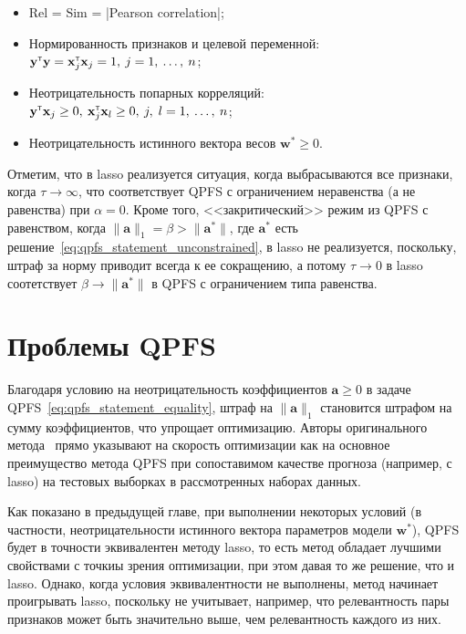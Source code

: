 \documentclass[12pt, a4paper]{article}
\newcommand{\T}{{\text{\tiny\sffamily\upshape\mdseries T}}}
\newcommand{\yvec}{\mathbf{y}}
\newcommand{\xvec}{\mathbf{x}}
\newcommand{\wvec}{\mathbf{w}}
\newcommand{\avec}{\mathbf{a}}
\begin{document}
\begin{itemize}
\item Rel = Sim = |Pearson correlation|;
\item Нормированность признаков и целевой переменной: $\yvec^{\T} \yvec = \xvec_j^{\T} \xvec_j = 1,\:j=1,\:\ldots,\:n$;
\item Неотрицательность попарных корреляций: $\yvec^{\T} \xvec_j \geq 0,\:\xvec_j^{\T} \xvec_l \geq 0,\:j,\;l=1,\:\ldots,\:n$;
\item Неотрицательность истинного вектора весов $\wvec^* \geq 0$.
\end{itemize}
Отметим, что в lasso реализуется ситуация, когда выбрасываются все признаки, когда $\tau \to \infty$, что соответствует QPFS с ограничением неравенства (а не равенства) при $\alpha=0$. Кроме того, <<закритический>> режим из QPFS с равенством, когда $\|\avec\|_1 = \beta > \|\avec^*\|$, где $\avec^*$ есть решение~\eqref{eq:qpfs_statement_unconstrained}, в lasso не реализуется, поскольку, штраф за норму приводит всегда к ее сокращению, а потому $\tau \to 0$ в lasso соотетствует $\beta \to \|\avec^*\|$ в QPFS с ограничением типа равенства.

\section*{Проблемы QPFS}
Благодаря условию на неотрицательность коэффициентов $\avec \geq 0$ в задаче QPFS~\eqref{eq:qpfs_statement_equality}, штраф на $\|\avec\|_1$ становится штрафом на сумму коэффициентов, что упрощает оптимизацию. Авторы оригинального метода~\cite{qpfs_original} прямо указывают на скорость оптимизации как на основное преимущество метода QPFS при сопоставимом качестве прогноза (например, с lasso) на тестовых выборках в рассмотренных наборах данных. 

Как показано в предыдущей главе, при выполнении некоторых условий (в частности, неотрицательности истинного вектора параметров модели $\wvec^*$), QPFS будет в точности эквивалентен методу lasso, то есть метод обладает лучшими свойствами с точкиы зрения оптимизации, при этом давая то же решение, что и lasso. Однако, когда условия эквивалентности не выполнены, метод начинает проигрывать lasso, поскольку не учитывает, например, что релевантность пары признаков может быть значительно выше, чем релевантность каждого из них.
\end{document}
